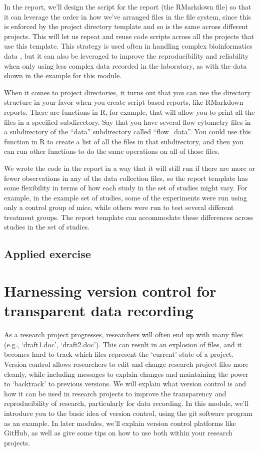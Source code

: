 \documentclass[]{tufte-book}
\begin{document}
In the report, we'll design the script for the report (the RMarkdown file) so
that it can leverage the order in how we've arranged files in the file system,
since this is enforced by the project directory template and so is the same
across different projects. This will let us repeat and reuse code scripts across
all the projects that use this template. This strategy is used often in handling
complex bioinformatics data \citep{buffalo2015bioinformatics}, but it can also be
leveraged to improve the reproducibility and reliability when only using less
complex data recorded in the laboratory, as with the data shown in the example
for this module.

When it comes to project directories, it turns out that you can use the
directory structure in your favor when you create script-based reports, like
RMarkdown reports. There are functions in R, for example, that will allow you to
print all the files in a specified subdirectory. Say that you have several flow
cytometry files in a subdirectory of the ``data'' subdirectory called ``flow\_data''.
You could use this function in R to create a list of all the files in that
subdirectory, and then you can run other functions to do the same operations on
all of those files.

We wrote the code in the report in a way that it will still run if there are
more or fewer observations in any of the data collection files, so the report
template has some flexibility in terms of how each study in the set of studies
might vary. For example, in the example set of studies, some of the experiments
were run using only a control group of mice, while others were run to test
several different treatment groups. The report template can accommodate
these differences across studies in the set of studies.

\subsection{Applied exercise}\label{applied-exercise-1}

\section{Harnessing version control for transparent data recording}\label{module9}

As a research project progresses, researchers will often end up with many files
(e.g., `draft1.doc', `draft2.doc'). This can result in an explosion of files,
and it becomes hard to track which files represent the `current' state of a
project. Version control allows researchers to edit and change research project
files more cleanly, while including messages to explain changes and maintaining
the power to `backtrack' to previous versions. We will explain what version
control is and how it can be used in research projects to improve the
transparency and reproducibility of research, particularly for data recording.
In this module, we'll introduce you to the basic idea of version control, using
the git software program as an example. In later modules, we'll explain version
control platforms like GitHub, as well as give some tips on how to use both
within your research projects.
\end{document}
